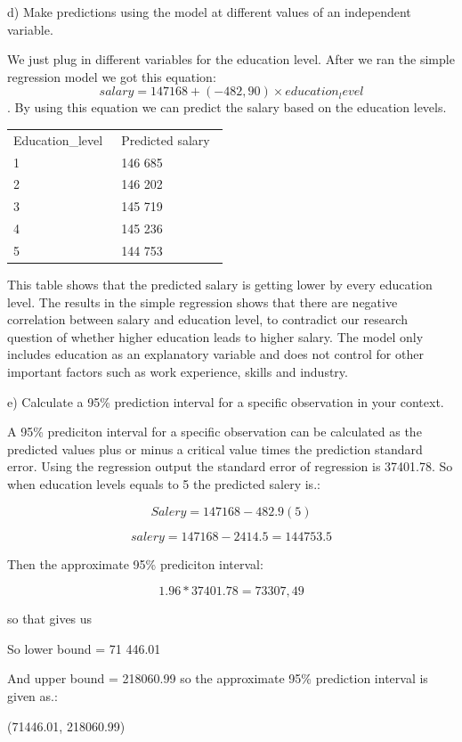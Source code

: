 \documentclass[
  letterpaper,
  DIV=11,
  numbers=noendperiod]{scrartcl}
\newcounter{none} %
\begin{document}
d) Make predictions using the model at different values of an
independent variable.~

We just plug in different variables for the education level. After we
ran the simple regression model we got this equation:
\[salary = 147168 + (-482,90) × education_level\]. By using this
equation we can predict the salary based on the education levels.

{\def\LTcaptype{none} %
\begin{longtable}[]{@{}ll@{}}
\toprule\noalign{}
\endhead
\bottomrule\noalign{}
\endlastfoot
Education\_level~ & Predicted salary~ \\
1~ & 146 685~ \\
2~ & 146 202~ \\
3~ & 145 719~ \\
4~ & 145 236~ \\
5~ & 144 753~ \\
\end{longtable}
}

This table shows that the predicted salary is getting lower by every
education level. The results in the simple regression shows that there
are negative correlation between salary and education level, to
contradict our research question of whether higher education leads to
higher salary. The model only includes education as an explanatory
variable and does not control for other important factors such as work
experience, skills and industry.~

e) Calculate a 95\% prediction interval for a specific observation in
your context.~

A 95\% prediciton interval for a specific observation can be calculated
as the predicted values plus or minus a critical value times the
prediction standard error. Using the regression output the standard
error of regression is 37401.78. So when education levels equals to 5
the predicted salery is.:~

\[
Salery=147168-482.9(5)
\]

\[
salery=147168-2414.5=144753.5
\]

Then the approximate 95\% prediciton interval:

\[
1.96*37401.78=73307,49
\]

so that gives us

So lower bound = 71 446.01

And upper bound = 218060.99 so the approximate 95\% prediction interval
is given as.:

(71446.01, 218060.99)
\end{document}
